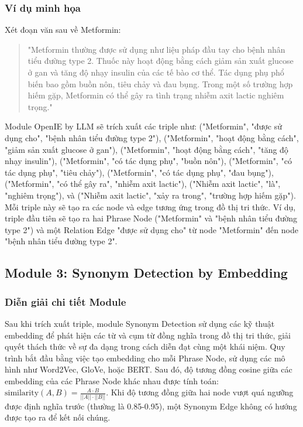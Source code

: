\documentclass{article}
\begin{document}
\subsubsection{Ví dụ minh họa}
Xét đoạn văn sau về Metformin:

\begin{quote}
"Metformin thường được sử dụng như liệu pháp đầu tay cho bệnh nhân tiểu đường type 2. Thuốc này hoạt động bằng cách giảm sản xuất glucose ở gan và tăng độ nhạy insulin của các tế bào cơ thể. Tác dụng phụ phổ biến bao gồm buồn nôn, tiêu chảy và đau bụng. Trong một số trường hợp hiếm gặp, Metformin có thể gây ra tình trạng nhiễm axit lactic nghiêm trọng."
\end{quote}

Module OpenIE by LLM sẽ trích xuất các triple như: ("Metformin", "được sử dụng cho", "bệnh nhân tiểu đường type 2"), ("Metformin", "hoạt động bằng cách", "giảm sản xuất glucose ở gan"), ("Metformin", "hoạt động bằng cách", "tăng độ nhạy insulin"), ("Metformin", "có tác dụng phụ", "buồn nôn"), ("Metformin", "có tác dụng phụ", "tiêu chảy"), ("Metformin", "có tác dụng phụ", "đau bụng"), ("Metformin", "có thể gây ra", "nhiễm axit lactic"), ("Nhiễm axit lactic", "là", "nghiêm trọng"), và ("Nhiễm axit lactic", "xảy ra trong", "trường hợp hiếm gặp"). Mỗi triple này sẽ tạo ra các node và edge tương ứng trong đồ thị tri thức. Ví dụ, triple đầu tiên sẽ tạo ra hai Phrase Node ("Metformin" và "bệnh nhân tiểu đường type 2") và một Relation Edge "được sử dụng cho" từ node "Metformin" đến node "bệnh nhân tiểu đường type 2".

\subsection{Module 3: Synonym Detection by Embedding}

\subsubsection{Diễn giải chi tiết Module}
Sau khi trích xuất triple, module Synonym Detection sử dụng các kỹ thuật embedding để phát hiện các từ và cụm từ đồng nghĩa trong đồ thị tri thức, giải quyết thách thức về sự đa dạng trong cách diễn đạt cùng một khái niệm. Quy trình bắt đầu bằng việc tạo embedding cho mỗi Phrase Node, sử dụng các mô hình như Word2Vec, GloVe, hoặc BERT. Sau đó, độ tương đồng cosine giữa các embedding của các Phrase Node khác nhau được tính toán: $\text{similarity}(A, B) = \frac{A \cdot B}{||A|| \cdot ||B||}$. Khi độ tương đồng giữa hai node vượt quá ngưỡng được định nghĩa trước (thường là 0.85-0.95), một Synonym Edge không có hướng được tạo ra để kết nối chúng.
\end{document}
